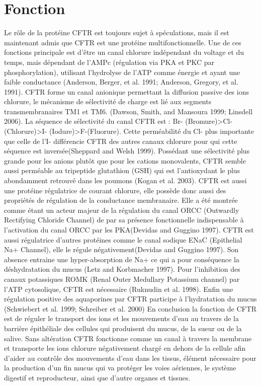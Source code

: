 		\section{Fonction}
Le rôle de la protéine CFTR est toujours sujet à spéculations, mais il est maintenant admis que CFTR est une protéine multifonctionnelle. Une de ces fonctions principale est d’être un canal chlorure indépendant du voltage et du temps, mais dépendant de l’AMPc (régulation via PKA et PKC par phosphorylation), utilisant l’hydrolyse de l’ATP comme énergie et ayant une faible conductance (Anderson, Berger, et al. 1991; Anderson, Gregory, et al. 1991)\cite{anderson_nucleoside_1991}\cite{anderson_demonstration_1991}. CFTR forme un canal anionique permettant la diffusion passive des ions chlorure, le mécanisme de sélectivité de charge est lié aux segments transmembranaires TM1 et TM6. (Dawson, Smith, and Mansoura 1999; Linsdell 2006)\cite{dawson_cftr:_1999}\cite{linsdell_mechanism_2006}. La séquence de sélectivité du canal CFTR est : Br- (Bromure)>Cl- (Chlorure)>I- (Iodure)>F-(Fluorure). Cette perméabilité du Cl- plus importante que celle de l’I- différencie CFTR des autres canaux chlorure pour qui cette séquence est inversée(Sheppard and Welsh 1999)\cite{sheppard_structure_1999}. Possédant une sélectivité plus grande pour les anions plutôt que pour les cations monovalents, CFTR semble aussi perméable au tripeptide glutathion (GSH) qui est l’antioxydant le plus abondamment retrouvé dans les poumons (Kogan et al. 2003)\cite{kogan_cftr_2003}.
CFTR est aussi une protéine régulatrice de courant chlorure, elle possède donc aussi des propriétés de régulation de la conductance membranaire. Elle a été montrée comme étant un acteur majeur de la régulation du canal ORCC (Outwardly Rectifying Chloride Channel) de par sa présence fonctionnelle indispensable à l'activation du canal ORCC par les PKA(Devidas and Guggino 1997)\cite{devidas_cftr:_1997}. CFTR est aussi régulatrice d’autres protéines comme le canal sodique ENaC (Epithelial Na+ Channel), elle le régule négativement(Devidas and Guggino 1997)\cite{devidas_cftr:_1997}. Son absence entraine une hyper-absorption de Na+ ce qui a pour conséquence la déshydratation du mucus (Letz and Korbmacher 1997)\cite{letz_camp_1997}. Pour l’inhibition des canaux potassiques ROMK (Renal Outer Medullary Potassium channel) par l’ATP cytosolique, CFTR est nécessaire (Ruknudin et al. 1998)\cite{ruknudin_novel_1998}. Enfin une régulation positive des aquaporines par CFTR participe à l’hydratation du mucus (Schwiebert et al. 1999; Schreiber et al. 2000) \cite{schwiebert_cftr_1999}\cite{schreiber_aquaporin_2000}
En conclusion la fonction de CFTR est de réguler le transport des ions et les mouvements d’eau au travers de la barrière épithéliale des cellules qui produisent du mucus, de la sueur ou de la salive. Sans altération CFTR fonctionne comme un canal à travers la membrane et transporte les ions chlorure négativement chargé en dehors de la cellule afin d’aider au contrôle des mouvements d’eau dans les tissus, élément nécessaire pour la production d’un fin mucus qui va protéger les voies aériennes, le système digestif et reproducteur, ainsi que d’autre organes et tissues. 

